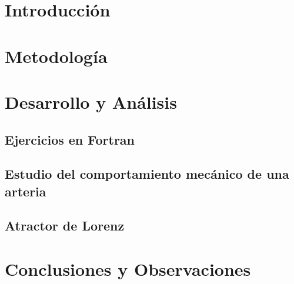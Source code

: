 \documentclass[letterpaper]{article}
\begin{document}
\newpage

\section{Introducción}







\newpage

\section{Metodología}


\newpage

\section{Desarrollo y Análisis} \label{DESARROLLO_Y_ANALISIS}


\subsection{Ejercicios en Fortran}



\subsection{Estudio del comportamiento mecánico de una arteria}




\subsection{Atractor de Lorenz}


\newpage

\section{Conclusiones y Observaciones}

\newpage
\end{document}

